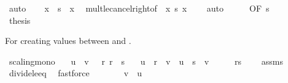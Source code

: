 \begin{isabellebody}
\ auto\isanewline
\ \ \isamarkupfalse%
\ {\isachardoublequoteopen}x\ {\isasymle}\ s\ {\isacharasterisk}{\kern0pt}\ x{\isachardoublequoteclose}\ \isamarkupfalse%
\ mult{\isacharunderscore}{\kern0pt}le{\isacharunderscore}{\kern0pt}cancel{\isacharunderscore}{\kern0pt}right{\isacharbrackleft}{\kern0pt}of\ {}\ x\ s{\isacharbrackright}{\kern0pt}\ {\isacartoucheopen}x\ {\isasymle}\ {}{\isacartoucheclose}\ \isamarkupfalse%
\ auto\isanewline
\ \ \isamarkupfalse%
\ \isamarkupfalse%
\ {\isacharasterisk}{\kern0pt}{\isacharbrackleft}{\kern0pt}OF\ s{\isacharbrackright}{\kern0pt}\isanewline
\ \ \isamarkupfalse%
\ \isamarkupfalse%
\ {\isacharquery}{\kern0pt}thesis\ \isacommand{{\isachardot}{\kern0pt}}\isamarkupfalse%
\isanewline
{}\isamarkupfalse%
%
\endisatagproof
{\isafoldproof}%
%
\isadelimproof
%
\endisadelimproof
%
\begin{isamarkuptext}%
For creating values between  and .%
\end{isamarkuptext}\isamarkuptrue%
\isamarkupfalse%
\ scaling{\isacharunderscore}{\kern0pt}mono{\isacharcolon}{\kern0pt}\isanewline
\ \ \ {\isachardoublequoteopen}u\ {\isasymle}\ v{\isachardoublequoteclose}\ {\isachardoublequoteopen}{}\ {\isasymle}\ r{\isachardoublequoteclose}\ {\isachardoublequoteopen}r\ {\isasymle}\ s{\isachardoublequoteclose}\isanewline
\ \ \ {\isachardoublequoteopen}u\ {\isacharplus}{\kern0pt}\ r\ {\isacharasterisk}{\kern0pt}\ {\isacharparenleft}{\kern0pt}v\ {\isacharminus}{\kern0pt}\ u{\isacharparenright}{\kern0pt}\ {\isacharslash}{\kern0pt}\ s\ {\isasymle}\ v{\isachardoublequoteclose}\isanewline
%
\isadelimproof
%
\endisadelimproof
%
\isatagproof
{}\isamarkupfalse%
\ {\isacharminus}{\kern0pt}\isanewline
\ \ \isamarkupfalse%
\ {\isachardoublequoteopen}r{\isacharslash}{\kern0pt}s\ {\isasymle}\ {}{\isachardoublequoteclose}\ \isamarkupfalse%
\ assms\isanewline
\ \ \ \ \isamarkupfalse%
\ divide{\isacharunderscore}{\kern0pt}le{\isacharunderscore}{\kern0pt}eq{\isacharunderscore}{\kern0pt}{}\ \isamarkupfalse%
\ fastforce\isanewline
\ \ \isamarkupfalse%
\ \isamarkupfalse%
\ {\isachardoublequoteopen}{}\ {\isasymle}\ v\ {\isacharminus}{\kern0pt}\ u{\isachardoublequoteclose}\isanewline
\ \ \ \ \isamarkupfalse%

\end{isabellebody}
